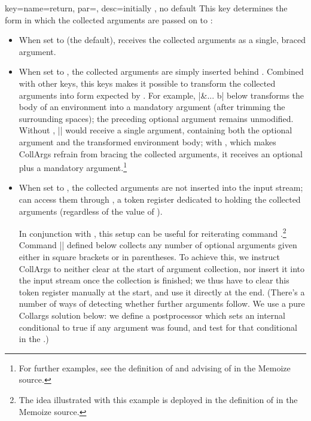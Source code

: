 \documentclass[a4paper,11pt]{article}
\begin{document}
\begin{doc}[%
    pi=\docaux{cmd}{collargsReturn}
  ]{
    key={name=return,
      par=,
      desc={initially , no default}
    }
  }
  This key determines the form in which the collected arguments are passed on
  to :
  \begin{itemize}
  \item When set to  (the default), 
    receives the collected arguments as a single, braced argument.
  \item When set to , the collected arguments are
    simply inserted behind .  Combined with other keys, this
    keys makes it possible to transform the collected arguments into form
    expected by .  For example, |&{...} b| below transforms the
    body of an environment into a mandatory argument (after trimming the
    surrounding spaces); the preceding optional argument remains unmodified.
    Without ,
    |\processbody| would receive a single argument, containing both the
    optional argument and the transformed environment body; with
    , which makes
    CollArgs refrain from bracing the collected arguments, it receives an
    optional plus a mandatory argument.\footnote{For further examples, see the
      definition of  and advising of 
      in the Memoize source.}

  \item When set to , the collected arguments are not
    inserted into the input stream;  can access them through
    , a token register dedicated to holding the
    collected arguments (regardless of the value of ).

    In conjunction with , this setup can
    be useful for reiterating command .\footnote{The
      idea illustrated with this example is deployed in the definition of
       in the Memoize source.}  Command
    |\CollectOptionalArguments| defined below collects any number of optional
    arguments given either in square brackets or in parentheses.  To achieve
    this, we instruct CollArgs to neither clear  at the
    start of argument collection, nor insert it into the input stream once the
    collection is finished; we thus have to clear this token register manually
    at the start, and use it directly at the end.  (There's a number of ways of
    detecting whether further arguments follow.  We use a pure Collargs
    solution below: we define a postprocessor which sets an internal
    conditional to true if any argument was found, and test for that
    conditional in the .)
    

\end{itemize}
\end{doc}
\end{document}
